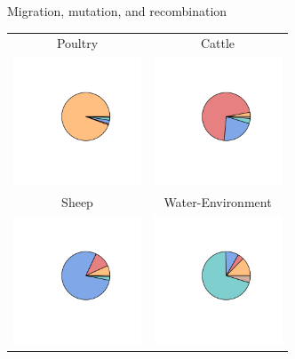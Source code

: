 \documentclass[]{beamer}
\begin{document}
\begin{frame}{Migration, mutation, and recombination}
\hspace{-30pt}
\begin{minipage}{0.5\linewidth}
\begin{tabular}{cc}
Poultry & Cattle\\
\includegraphics[width=1.5in, trim=70 60 40 60]{Pictures/island/migration_mutation1.pdf}
& \includegraphics[width=1.5in, trim=70 60 40 60]{Pictures/island/migration_mutation2.pdf}\\
Sheep & Water-Environment\\
\includegraphics[width=1.5in, trim=70 60 40 60]{Pictures/island/migration_mutation3.pdf}
&\includegraphics[width=1.5in, trim=70 60 40 60]{Pictures/island/migration_mutation4.pdf}
\end{tabular}
\end{minipage}
\hspace{110pt}
\begin{minipage}{0.2\linewidth}

\end{minipage}
\end{frame}
\end{document}
